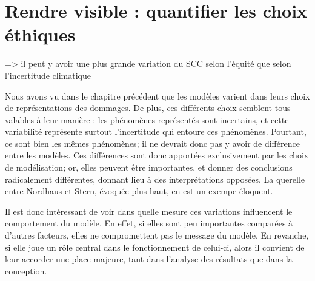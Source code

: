 \chapter{Rendre visible : quantifier les choix éthiques}
\label{chapter:modelisation}
\newrefsegment
{}





\cite{errickson_equity_2021} => il peut y avoir une plus grande variation du SCC selon l'équité que selon l'incertitude climatique

Nous avons vu dans le chapitre précédent que les modèles varient dans leurs choix de représentations des dommages. De plus, ces différents choix semblent tous valables à leur manière : les phénomènes représentés sont incertains, et cette variabilité représente surtout l'incertitude qui entoure ces phénomènes. Pourtant, ce sont bien les mêmes phénomènes; il ne devrait donc pas y avoir de différence entre les modèles. Ces différences sont donc apportées exclusivement par les choix de modélisation; or, elles peuvent être importantes, et donner des conclusions radicalement différentes, donnant lieu à des interprétations opposées. La querelle entre Nordhaus et Stern, évoquée plus haut, en est un exempe éloquent. 

Il est donc intéressant de voir dans quelle mesure ces variations influencent le comportement du modèle. En effet, si elles sont peu importantes comparées à d'autres facteurs, elles ne compromettent pas le message du modèle. En revanche, si elle joue un rôle central dans le fonctionnement de celui-ci, alors il convient de leur accorder une place majeure, tant dans l'analyse des résultats que dans la conception. 

